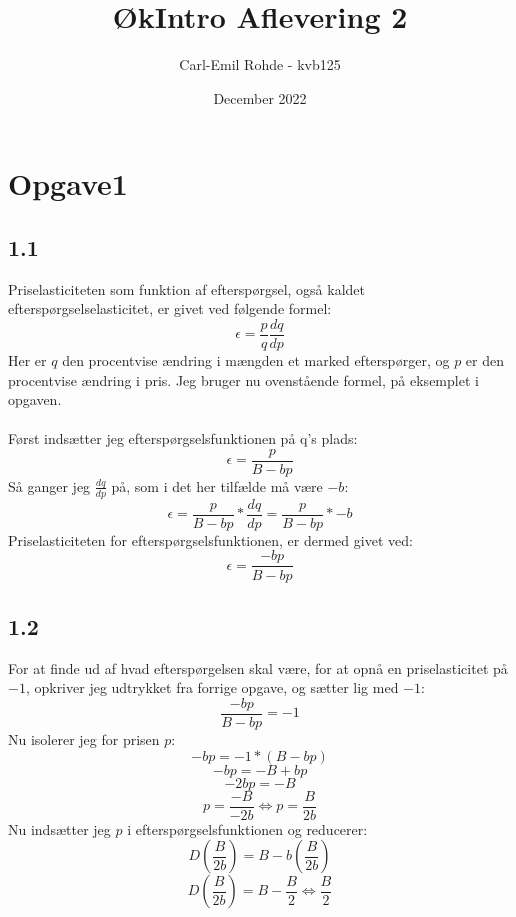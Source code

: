 \documentclass{article}
\begin{document}
\title{ØkIntro Aflevering 2}
\author{Carl-Emil Rohde - kvb125}
\date{December 2022}
\maketitle

\section*{Opgave1}
\subsection*{1.1}
Priselasticiteten som funktion af efterspørgsel, også kaldet efterspørgselselasticitet, er givet ved følgende formel:
\begin{equation}
    \epsilon=\frac{p}{q} \frac{dq}{dp}
\end{equation}
Her er $q$ den procentvise ændring i mængden et marked efterspørger, og $p$ er den procentvise ændring i pris. Jeg bruger nu ovenstående formel, på eksemplet i opgaven. 
\\
\\Først indsætter jeg efterspørgselsfunktionen på q's plads:
\begin{equation}
    \epsilon=\frac{p}{B-bp}
\end{equation}
Så ganger jeg $\frac{dq}{dp}$ på, som i det her tilfælde må være $-b$:
\begin{equation}
    \epsilon=\frac{p}{B-bp}*\frac{dq}{dp}=\frac{p}{B-bp}*-b
\end{equation}
Priselasticiteten for efterspørgselsfunktionen, er dermed givet ved: 
\begin{equation}
    \epsilon=\frac{-bp}{B-bp}
\end{equation}

\subsection*{1.2}
For at finde ud af hvad efterspørgelsen skal være, for at opnå en priselasticitet på $-1$, opkriver jeg udtrykket fra forrige opgave, og sætter lig med $-1$:
\begin{equation}
    \frac{-bp}{B-bp}=-1
\end{equation}
Nu isolerer jeg for prisen $p$:
\begin{equation}
    -bp=-1*(B-bp)
\end{equation}
\begin{equation}
    -bp=-B+bp
\end{equation}
\begin{equation}
    -2bp=-B
\end{equation}
\begin{equation}
    p=\frac{-B}{-2b} \Leftrightarrow p=\frac{B}{2b}
\end{equation}
Nu indsætter jeg $p$ i efterspørgselsfunktionen og reducerer:
\begin{equation}
    D(\frac{B}{2b})=B-b(\frac{B}{2b})
\end{equation}
\begin{equation}
    D(\frac{B}{2b})=B-\frac{B}{2} \Leftrightarrow \frac{B}{2}
\end{equation}
\end{document}
